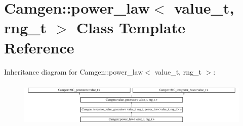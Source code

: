 \hypertarget{a00434}{}\section{Camgen\+:\+:power\+\_\+law$<$ value\+\_\+t, rng\+\_\+t $>$ Class Template Reference}
\label{a00434}
Inheritance diagram for Camgen\+:\+:power\+\_\+law$<$ value\+\_\+t, rng\+\_\+t $>$\+:\begin{figure}[H]
\begin{center}
\leavevmode
\includegraphics[height=2.240000cm]{a00434}
\end{center}
\end{figure}

